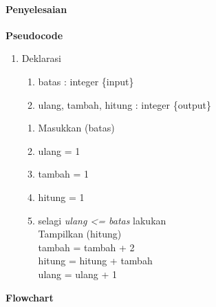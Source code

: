 \documentclass[a4paper,12pt]{article}
\begin{document}
\paragraph{Penyelesaian\\}
{\bfseries Pseudocode\\}
\begin{enumerate}
	\item Deklarasi
	\begin{enumerate}[label=\arabic*.]
		\item batas : integer \{input\}
		\item ulang, tambah, hitung : integer \{output\}
	\end{enumerate}
	\begin{enumerate}[label=\arabic*.]
		\item Masukkan (batas)
		\item ulang = 1
		\item tambah = 1
		\item hitung = 1
		\item selagi \textit{ulang <= batas} lakukan\\
		 Tampilkan (hitung)\\
		 tambah = tambah + 2\\
		 hitung = hitung + tambah\\
		 ulang = ulang + 1	
	\end{enumerate}
\end{enumerate}
{\bfseries Flowchart\\}
\end{document}

